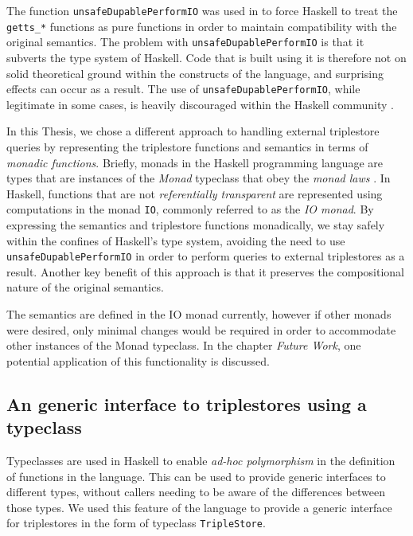 \documentclass[../main.tex]{subfiles}
\begin{document}
The function \texttt{unsafeDupablePerformIO} was used in \cite{agboola2015extensible} to force Haskell to treat the \texttt{getts\_*} functions as pure functions
in order to maintain compatibility with the original semantics. The problem with \texttt{unsafeDupablePerformIO} is that it subverts the type system of Haskell.  Code that is built using it is therefore not on
solid theoretical ground within the constructs of the language, and surprising effects can occur as a result.  The use of \texttt{unsafeDupablePerformIO}, while
legitimate in some cases, is heavily discouraged within the Haskell community \cite{noUnsafePerformIO}.

In this Thesis, we chose a different approach to handling external triplestore queries by representing the triplestore functions and semantics in terms of {\em monadic functions}.
Briefly, monads in the Haskell programming language are types that are instances of the {\em Monad} typeclass that obey the
{\em monad laws} \cite{monadlaws}.  In Haskell, functions that are not {\em referentially transparent} are represented using computations in the monad \texttt{IO}, commonly referred to as the {\em IO monad}.  By expressing the semantics and triplestore functions monadically, we stay safely within the confines of Haskell's type system, avoiding
the need to use \texttt{unsafeDupablePerformIO} in order to perform queries to external triplestores as a result.  Another key benefit of this approach is that it preserves the compositional nature of the original semantics.

The semantics are defined in the IO monad currently, however if other monads were desired, only minimal changes would be required in order to accommodate
other instances of the Monad typeclass.  In the chapter {\em Future Work}, one potential application of this functionality is discussed.

\subsection{An generic interface to triplestores using a typeclass}

Typeclasses are used in Haskell to enable {\em ad-hoc polymorphism} in the definition of functions in the language.  This can be used
to provide generic interfaces to different types, without callers needing to be aware of the differences between those types.
We used this feature of the language to provide a generic interface for triplestores in the form of typeclass \texttt{TripleStore}.
\end{document}
